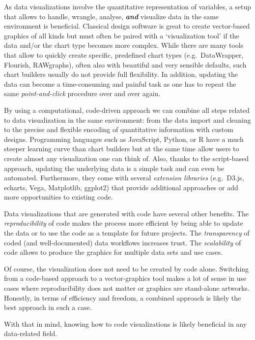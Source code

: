 \documentclass[
]{krantz}
\begin{document}
As data visualizations involve the quantitative representation of variables, a setup that allows to handle, wrangle, analyse, \textbf{\emph{and}} visualize data in the same environment is beneficial. Classical design software is great to create vector-based graphics of all kinds but must often be paired with a `visualization tool' if the data and/or the chart type becomes more complex. While there are many tools that allow to quickly create specific, predefined chart types (e.g.~DataWrapper, Flourish, RAWgraphs), often also with beautiful and very sensible defaults, such chart builders usually do not provide full flexibility. In addition, updating the data can become a time-consuming and painful task as one has to repeat the same \emph{point-and-click} procedure over and over again.

By using a computational, code-driven approach we can combine all steps related to data visualization in the same environment: from the data import and cleaning to the precise and flexible encoding of quantitative information with custom designs. Programming languages such as JavaScript, Python, or R have a much steeper learning curve than chart builders but at the same time allow users to create almost any visualization one can think of. Also, thanks to the script-based approach, updating the underlying data is a simple task and can even be automated. Furthermore, they come with several \emph{extension libraries} (e.g.~D3.js, echarts, Vega, Matplotlib, ggplot2) that provide additional approaches or add more opportunities to existing code.

Data visualizations that are generated with code have several other benefits. The \emph{reproducibility} of code makes the process more efficient by being able to update the data or to use the code as a template for future projects. The \emph{transparency} of coded (and well-documented) data workflows increases trust. The \emph{scalability} of code allows to produce the graphics for multiple data sets and use cases.

Of course, the visualization does not need to be created by code alone. Switching from a code-based approach to a vector-graphics tool makes a lot of sense in use cases where reproducibility does not matter or graphics are stand-alone artworks. Honestly, in terms of efficiency and freedom, a combined approach is likely the best approach in such a case.

With that in mind, knowing how to code visualizations is likely beneficial in any data-related field.
\end{document}
